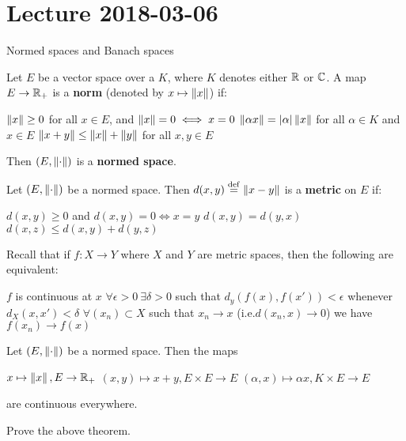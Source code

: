 \section{Lecture 2018-03-06}

Normed spaces and Banach spaces

\begin{defn}
	Let $E$ be a vector space over a $K$, where $K$ denotes either $\mathbb{R}$ or $\mathbb{C}$.
	A map $E \to \mathbb{R}_+$ is a \textbf{norm} (denoted by $x \mapsto \left\lVert x \right\rVert$) if:
	\begin{enum}
		\io $\left\lVert x \right\rVert \geq 0$ for all $x \in E$, and $\left\lVert x \right\rVert=0 \iff x=0$
		\io $\left\lVert \alpha x \right\rVert = \left\lvert \alpha \right\rvert \left\lVert x \right\rVert$ for all $\alpha \in K$ and $x \in E$
		\io $\left\lVert x+y \right\rVert \leq \left\lVert x \right\rVert + \left\lVert y \right\rVert$ for all $x,y \in E$
	\end{enum}
	Then $(E,\left\lVert \cdot \right\rVert)$ is a \textbf{normed space}.
\end{defn}

\begin{prop}
	Let $(E,\left\lVert \cdot \right\rVert)$ be a normed space.
	Then $d(x,y) \overset{\mathrm{def}}{=} \left\lVert x-y \right\rVert$ is a \textbf{metric} on $E$ if:
	\begin{enum}
		\io $d(x,y) \geq 0$ and $d(x,y)=0 \iff x=y$
		\io $d(x,y)=d(y,x)$
		\io $d(x,z) \leq d(x,y) + d(y,z)$
	\end{enum}
\end{prop}

\begin{prop}
	Recall that if $f:X \to Y$ where $X$ and $Y$ are metric spaces, then the following are equivalent:
	\begin{enum}
		\io $f$ is continuous at $x$
		\io $\forall \epsilon>0 \: \exists \delta>0$ such that $d_y(f(x),f(x'))<\epsilon$ whenever $d_X(x,x')<\delta$
		\io $\forall (x_n) \subset X$ such that $x_n \to x$ (i.e.\@ $d(x_n,x) \to 0$) we have $f(x_n) \to f(x)$
	\end{enum}
\end{prop}

\begin{thm}
	Let $(E,\left\lVert \cdot \right\rVert)$ be a normed space.
	Then the maps
	\begin{enum}
		\io $x \mapsto \left\lVert x \right\rVert, E \to \mathbb{R}_+$
		\io $(x,y) \mapsto x+y, E \times E \to E$
		\io $(\alpha,x) \mapsto \alpha x, K \times E \to E$
	\end{enum}
	are continuous everywhere.
\end{thm}

\begin{exer}
	Prove the above theorem.
\end{exer}

